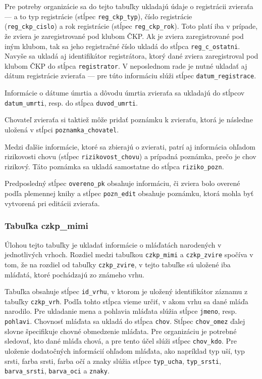 Pre potreby organizácie sa do tejto tabuľky ukladajú údaje o registrácii zvieraťa ---  a to typ registrácie (stĺpec \texttt{reg_ckp_typ}), číslo registrácie\\ (\texttt{reg_ckp_cislo}) a rok registrácie (stĺpec \texttt{reg_ckp_rok}). Toto platí iba v prípade, že zviera je zaregistrované pod klubom ČKP. Ak je zviera zaregistrované pod iným klubom, tak sa jeho registračné číslo ukladá do stĺpca \texttt{reg_c_ostatni}. Navyše sa ukladá aj identifikátor registrátora, ktorý dané zviera zaregistroval pod klubom ČKP do stĺpca \texttt{registrator}. V neposlednom rade je nutné ukladať aj dátum registrácie zvieraťa --- pre túto informáciu slúži stĺpec \texttt{datum_registrace}.

Informácie o dátume úmrtia a dôvodu úmrtia zvieraťa sa ukladajú do stĺpcov \texttt{datum_umrti}, resp. do stĺpca \texttt{duvod_umrti}.

Chovateľ zvieraťa si taktiež môže pridať poznámku k zvieraťu, ktorá je následne uložená v stĺpci \texttt{poznamka_chovatel}.

Medzi ďalšie informácie, ktoré sa zbierajú o zvierati, patrí aj informácia ohľadom rizikovosti chovu (stĺpec \texttt{rizikovost_chovu}) a prípadná poznámka, prečo je chov rizikový. Táto poznámka sa ukladá samostatne do stĺpca \texttt{riziko_pozn}.

Predposledný stĺpec \texttt{overeno_pk} obsahuje informáciu, či zviera bolo overené podľa plemennej knihy a stĺpec \texttt{pozn_edit} obsahuje poznámku, ktorá mohla byť vytvorená pri editácii zvieraťa.

\subsubsection{Tabuľka czkp\_mimi}

Úlohou tejto tabuľky je ukladať informácie o mláďatách narodených v jednotlivých vrhoch.
Rozdiel medzi tabuľkou \texttt{czkp_mimi} a \texttt{czkp_zvire} spočíva v tom, že na rozdiel od tabuľky \texttt{czkp_zvire}, v tejto tabuľke sú uložené iba mláďatá, ktoré pochádzajú zo známeho vrhu.

Tabuľka obsahuje stĺpec \texttt{id_vrhu}, v ktorom je uložený identifikátor záznamu z tabuľky \texttt{czkp_vrh}. Podľa tohto stĺpca vieme určiť, v akom vrhu sa dané mláďa narodilo. Pre ukladanie mena a pohlavia mláďata slúžia stĺpce \texttt{jmeno}, resp. \texttt{pohlavi}. Chovnosť mláďata sa ukladá do stĺpca \texttt{chov}. Stĺpec \texttt{chov_omez} ďalej slovne špecifikuje chovné obmedzenie mláďata. Pre organizáciu je potrebné sledovať, kto dané mláďa chová, a pre tento účel slúži stĺpec \texttt{chov_kdo}. Pre uloženie dodatočných informácií ohľadom mláďata, ako napríklad typ uší, typ srsti, farba srsti, farba očí a znaky slúžia stĺpce \texttt{typ_ucha}, \texttt{typ_srsti}, \texttt{barva_srsti}, \texttt{barva_oci} a \texttt{znaky}.

